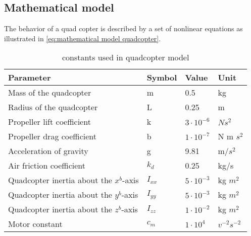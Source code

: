 \subsection{Mathematical model}
The behavior of a quad copter is described by a set of nonlinear equations as illustrated in \eqref{eq:mathematical model quadcopter}.

\begin{table}[]
	\centering
	\caption{constants used in quadcopter model}
	\label{btl:quadcopter model constants}
	\begin{tabular}{|l|l|l|l|}
		\hline
		Parameter                               & Symbol   & Value             & Unit           \\ \hline
		Mass of the quadcopter                  & m        & 0.5               & kg             \\
		Radius of the quadcopter                & L        & 0.25              & m              \\
		Propeller lift coefficient              & k        & $3 \cdot 10^{-6}$ & $Ns^2$        \\
		Propeller drag coefficient              & b        & $1 \cdot 10^{-7}$ & N m $s^2$      \\
		Acceleration of gravity                 & g        & 9.81              & m/$s^2$        \\
		Air friction coefficient                & $k_d$    & 0.25              & kg/s           \\
		Quadcopter inertia about the $x^b$-axis & $I_{xx}$ & $5 \cdot 10^{-3}$ & kg $m^2$       \\
		Quadcopter inertia about the $y^b$-axis & $I_{yy}$ & $5 \cdot 10^{-3}$ & kg $m^2$       \\
		Quadcopter inertia about the $z^b$-axis & $I_{zz}$ & $1 \cdot 10^{-2}$ & kg $m^2$       \\ 
		Motor constant                          & $c_m$    & $1 \cdot 10^{4}$  & $v^{-2}s^{-2}$ \\
		\hline
	\end{tabular}
\end{table}

